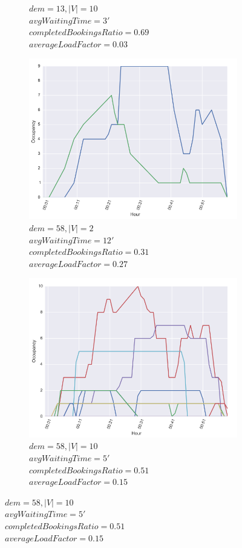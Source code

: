 \documentclass[12pt,a4paper]{article}
\begin{document}
\begin{figure}[]
\begin{subfigure}[b]{0.48\textwidth}
  \caption{$dem = 13, |V| = 10$\\ $avgWaitingTime = 3'$\\ $completedBookingsRatio = 0.69$ \\ $averageLoadFactor = 0.03$}
  \label{dem13v10}
\end{subfigure}
\begin{subfigure}[b]{0.48\textwidth}
  \includegraphics[width=\linewidth]{./images/dem582v}
  \caption{$dem = 58, |V| = 2$\\ $avgWaitingTime = 12'$\\ $completedBookingsRatio = 0.31$ \\ $averageLoadFactor = 0.27$}
  \label{dem58v2}
  \end{subfigure}
  \begin{subfigure}[b]{0.48\textwidth}
  \includegraphics[width=\linewidth]{./images/dem58v10}
  \caption{$dem = 58, |V| = 10$\\ $avgWaitingTime = 5'$\\ $completedBookingsRatio = 0.51$ \\ $averageLoadFactor = 0.15$}
  \label{dem58v10}
\end{subfigure}
\label{extremesimu}
\end{figure}
\end{document}

